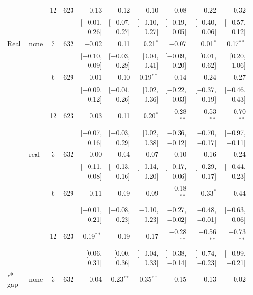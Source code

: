 \begin{longtable}{llcrrrrrrr}
 &  & 12 & 623 & 0.13 & 0.12 & 0.10 & $-$0.08 & $-$0.22 & $-$0.32\\
 & & & & {\scriptsize [$-$0.01, 0.26]} & {\scriptsize [$-$0.07, 0.27]} & {\scriptsize [$-$0.10, 0.27]} & {\scriptsize [$-$0.19, 0.05]} & {\scriptsize [$-$0.40, 0.06]} & {\scriptsize [$-$0.57, 0.12]}\\
\addlinespace
Real & none & 3 & 632 & $-$0.02 & 0.11 & 0.21$^{*}$ & $-$0.07 & 0.01$^{*}$ & 0.17$^{**}$\\
 & & & & {\scriptsize [$-$0.10, 0.09]} & {\scriptsize [$-$0.03, 0.29]} & {\scriptsize [0.04, 0.41]} & {\scriptsize [$-$0.09, 0.20]} & {\scriptsize [0.01, 0.62]} & {\scriptsize [0.20, 1.06]}\\
 &  & 6 & 629 & 0.01 & 0.10 & 0.19$^{**}$ & $-$0.14 & $-$0.24 & $-$0.27\\
 & & & & {\scriptsize [$-$0.09, 0.12]} & {\scriptsize [$-$0.04, 0.26]} & {\scriptsize [0.02, 0.36]} & {\scriptsize [$-$0.22, 0.03]} & {\scriptsize [$-$0.37, 0.19]} & {\scriptsize [$-$0.46, 0.43]}\\
 &  & 12 & 623 & 0.03 & 0.11 & 0.20$^{*}$ & $-$0.28$^{**}$ & $-$0.53$^{**}$ & $-$0.70$^{**}$\\
 & & & & {\scriptsize [$-$0.07, 0.16]} & {\scriptsize [$-$0.03, 0.29]} & {\scriptsize [0.02, 0.38]} & {\scriptsize [$-$0.36, $-$0.12]} & {\scriptsize [$-$0.70, $-$0.17]} & {\scriptsize [$-$0.97, $-$0.11]}\\
 & real & 3 & 632 & 0.00 & 0.04 & 0.07 & $-$0.10 & $-$0.16 & $-$0.24\\
 & & & & {\scriptsize [$-$0.11, 0.08]} & {\scriptsize [$-$0.13, 0.16]} & {\scriptsize [$-$0.14, 0.20]} & {\scriptsize [$-$0.17, 0.06]} & {\scriptsize [$-$0.29, 0.17]} & {\scriptsize [$-$0.44, 0.23]}\\
 &  & 6 & 629 & 0.11 & 0.09 & 0.09 & $-$0.18$^{**}$ & $-$0.33$^{*}$ & $-$0.44\\
 & & & & {\scriptsize [$-$0.01, 0.21]} & {\scriptsize [$-$0.08, 0.23]} & {\scriptsize [$-$0.10, 0.23]} & {\scriptsize [$-$0.27, $-$0.02]} & {\scriptsize [$-$0.48, $-$0.01]} & {\scriptsize [$-$0.63, 0.06]}\\
 &  & 12 & 623 & 0.19$^{**}$ & 0.19 & 0.17 & $-$0.28$^{**}$ & $-$0.56$^{**}$ & $-$0.73$^{**}$\\
 & & & & {\scriptsize [0.06, 0.31]} & {\scriptsize [0.00, 0.36]} & {\scriptsize [$-$0.04, 0.33]} & {\scriptsize [$-$0.38, $-$0.14]} & {\scriptsize [$-$0.74, $-$0.23]} & {\scriptsize [$-$0.99, $-$0.21]}\\
\addlinespace
r*-gap & none & 3 & 632 & 0.04 & 0.23$^{**}$ & 0.35$^{**}$ & $-$0.15 & $-$0.13 & $-$0.02\\

\end{longtable}
